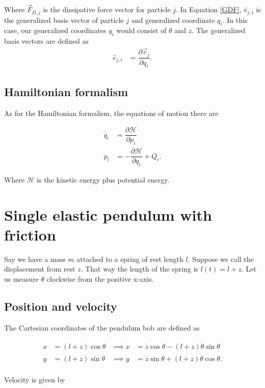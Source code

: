 \documentclass[12pt,a4paper,portrait]{article}
\newcommand{\ham}{\mathcal{H}}
\newcommand{\eq}[1]{Equation \eqref{#1}}
\begin{document}
Where $\vec{F}_{D,j}$ is the dissipative force vector for particle $j$. In \eq{GDF}, $\hat{e}_{j,i}$ is the generalized basis vector of particle $j$ and generalized coordinate $q_i$. In this case, our generalized coordinates $q_i$ would consist of $\theta$ and $z$. The generalized basis vectors are defined as
\begin{align*}
	\hat{e}_{j,i} &= \dfrac{\partial \vec{r}_j}{\partial q_i}.
\end{align*}
 
\subsection{Hamiltonian formalism}
As for the Hamiltonian formalism, the equations of motion there are

\begin{align}
	\dot{q}_i &= \dfrac{\partial \ham}{\partial p_i} \label{qdoti}\\
	\dot{p}_i &= -\dfrac{\partial \ham}{\partial q_i} + Q_i. \label{pdoti}
\end{align}

Where $\ham$ is the kinetic energy plus potential energy. 

\section{Single elastic pendulum with friction}
Say we have a mass $m$ attached to a spring of rest length $l$. Suppose we call the displacement from rest $z$. That way the length of the spring is $l(t) = l + z$. Let us measure  $\theta$ clockwise from the positive x-axis.

\subsection{Position and velocity}
The Cartesian coordinates of the pendulum bob are defined as

\begin{align*}
	x &= (l+z)\cos{\theta} &\implies \dot{x} &= \dot{z}\cos{\theta} - (l+z)\dot{\theta}\sin{\theta}\\
	y &= (l+z)\sin{\theta} &\implies \dot{y} &= \dot{z}\sin{\theta} + (l+z)\dot{\theta}\cos{\theta}.\\
\end{align*}

Velocity is given by
\end{document}
